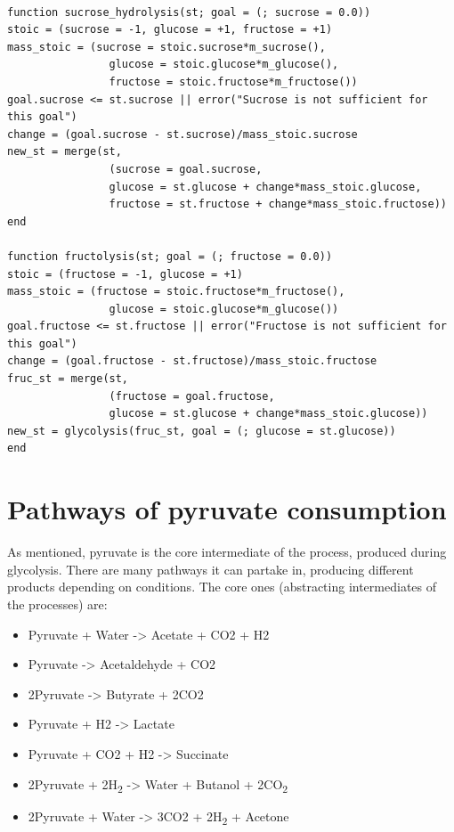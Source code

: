 \documentclass[11pt]{article}
\begin{document}
\begin{verbatim}

function sucrose_hydrolysis(st; goal = (; sucrose = 0.0))
stoic = (sucrose = -1, glucose = +1, fructose = +1)
mass_stoic = (sucrose = stoic.sucrose*m_sucrose(),
                glucose = stoic.glucose*m_glucose(),
                fructose = stoic.fructose*m_fructose())
goal.sucrose <= st.sucrose || error("Sucrose is not sufficient for this goal")
change = (goal.sucrose - st.sucrose)/mass_stoic.sucrose
new_st = merge(st,
                (sucrose = goal.sucrose,
                glucose = st.glucose + change*mass_stoic.glucose,
                fructose = st.fructose + change*mass_stoic.fructose))
end

function fructolysis(st; goal = (; fructose = 0.0))
stoic = (fructose = -1, glucose = +1)
mass_stoic = (fructose = stoic.fructose*m_fructose(),
                glucose = stoic.glucose*m_glucose())
goal.fructose <= st.fructose || error("Fructose is not sufficient for this goal")
change = (goal.fructose - st.fructose)/mass_stoic.fructose
fruc_st = merge(st,
                (fructose = goal.fructose,
                glucose = st.glucose + change*mass_stoic.glucose))
new_st = glycolysis(fruc_st, goal = (; glucose = st.glucose))
end

\end{verbatim}

\section{Pathways of pyruvate consumption}
\label{sec:orgc2b8663}
As mentioned, pyruvate is the core intermediate of the process, produced during glycolysis. There are many pathways it can partake in, producing different products depending on conditions. The core ones (abstracting intermediates of the processes) are:

\begin{itemize}
\item Pyruvate + Water -> Acetate + CO2 + H2
\item Pyruvate -> Acetaldehyde + CO2
\item 2Pyruvate -> Butyrate + 2CO2
\item Pyruvate + H2 -> Lactate
\item Pyruvate + CO2 + H2 -> Succinate
\item 2Pyruvate + 2H\textsubscript{2} -> Water + Butanol + 2CO\textsubscript{2}
\item 2Pyruvate + Water -> 3CO2 + 2H\textsubscript{2} + Acetone
\end{itemize}
\end{document}
